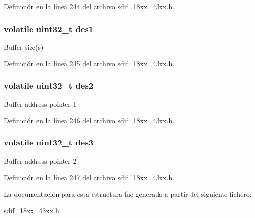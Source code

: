 Definición en la línea 244 del archivo sdif\+\_\+18xx\+\_\+43xx.\+h.

\subsubsection[{\texorpdfstring{des1}{des1}}]{\setlength{\rightskip}{0pt plus 5cm}volatile uint32\+\_\+t des1}\hypertarget{structp_s_d_m_m_c___d_m_a___t_adffc8c6c1a159b5f6377e98ad54cc265}{}\label{structp_s_d_m_m_c___d_m_a___t_adffc8c6c1a159b5f6377e98ad54cc265}
Buffer size(s) 

Definición en la línea 245 del archivo sdif\+\_\+18xx\+\_\+43xx.\+h.

\subsubsection[{\texorpdfstring{des2}{des2}}]{\setlength{\rightskip}{0pt plus 5cm}volatile uint32\+\_\+t des2}\hypertarget{structp_s_d_m_m_c___d_m_a___t_add829c6161aaea38a87efe8524e7c044}{}\label{structp_s_d_m_m_c___d_m_a___t_add829c6161aaea38a87efe8524e7c044}
Buffer address pointer 1 

Definición en la línea 246 del archivo sdif\+\_\+18xx\+\_\+43xx.\+h.

\subsubsection[{\texorpdfstring{des3}{des3}}]{\setlength{\rightskip}{0pt plus 5cm}volatile uint32\+\_\+t des3}\hypertarget{structp_s_d_m_m_c___d_m_a___t_acfa980823f7205141925661794c6396b}{}\label{structp_s_d_m_m_c___d_m_a___t_acfa980823f7205141925661794c6396b}
Buffer address pointer 2 

Definición en la línea 247 del archivo sdif\+\_\+18xx\+\_\+43xx.\+h.



La documentación para esta estructura fue generada a partir del siguiente fichero\+:\begin{DoxyCompactItemize}
\item 
\hyperlink{sdif__18xx__43xx_8h}{sdif\+\_\+18xx\+\_\+43xx.\+h}\end{DoxyCompactItemize}
